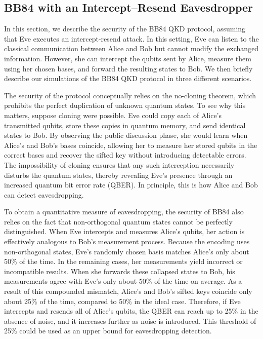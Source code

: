 \subsection{BB84 with an Intercept–Resend Eavesdropper} \label{sec:embeddings}

In this section, we describe the security of the BB84 QKD protocol, assuming that Eve executes an intercept-resend attack. In this setting, Eve can listen to the classical communication between Alice and Bob but cannot modify the exchanged information. However, she can intercept the qubits sent by Alice, measure them using her chosen bases, and forward the resulting states to Bob. We then briefly describe our simulations of the BB84 QKD protocol in three different scenarios.
 
The security of the protocol conceptually relies on the no-cloning theorem, which prohibits the perfect duplication of unknown quantum states. To see why this matters, suppose cloning were possible. Eve could copy each of Alice’s transmitted qubits, store these copies in quantum memory, and send identical states to Bob. By observing the public discussion phase, she would learn when Alice’s and Bob’s bases coincide, allowing her to measure her stored qubits in the correct bases and recover the sifted key without introducing detectable errors. The impossibility of cloning ensures that any such interception necessarily disturbs the quantum states, thereby revealing Eve’s presence through an increased quantum bit error rate (QBER). In principle, this is how Alice and Bob can detect eavesdropping.

To obtain a quantitative measure of eavesdropping, the security of BB84 also relies on the fact that non-orthogonal quantum states cannot be perfectly distinguished. When Eve intercepts and measures Alice’s qubits, her action is effectively analogous to Bob’s measurement process. Because the encoding uses non-orthogonal states, Eve’s randomly chosen basis matches Alice’s only about 50\% of the time. In the remaining cases, her measurements yield incorrect or incompatible results. When she forwards these collapsed states to Bob, his measurements agree with Eve’s only about 50\% of the time on average. As a result of this compounded mismatch, Alice’s and Bob’s sifted keys coincide only about 25\% of the time, compared to 50\% in the ideal case. Therefore, if Eve intercepts and resends all of Alice’s qubits, the QBER can reach up to 25\% in the absence of noise, and it increases further as noise is introduced. This threshold of 25\% could be used as an upper bound for eavesdropping detection.

